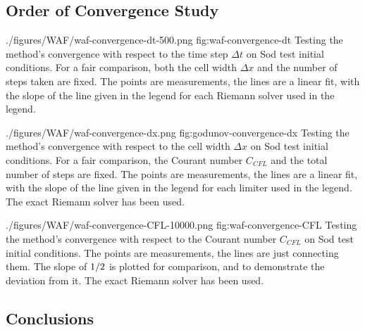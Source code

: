 \subsection{Order of Convergence Study}



\quickfigcap
	{./figures/WAF/waf-convergence-dt-500.png}
	{fig:waf-convergence-dt}
	{
		Testing the method's convergence with respect to the time step $\Delta t$ on Sod test initial conditions.
		For a fair comparison, both the cell width $\Delta x$ and the number of steps taken are fixed.
		The points are measurements, the lines are a linear fit, with the slope of the line given in the legend for each Riemann solver used in the legend.
	}


\quickfigcap
	{./figures/WAF/waf-convergence-dx.png}
	{fig:godunov-convergence-dx}
	{
		Testing the method's convergence with respect to the cell width $\Delta x$ on Sod test initial conditions.
		For a fair comparison, the Courant number $C_{CFL}$ and the total number of steps are fixed.
		The points are measurements, the lines are a linear fit, with the slope of the line given in the legend for each limiter used in the legend.
		The exact Riemann solver has been used.
	}
	
\quickfigcap
	{./figures/WAF/waf-convergence-CFL-10000.png}
	{fig:waf-convergence-CFL}
	{
		Testing the method's convergence with respect to the Courant number $C_{CFL}$ on Sod test initial conditions.
		The points are measurements, the lines are just connecting them.
		The slope of $1/2$ is plotted for comparison, and to demonstrate the deviation from it.
		The exact Riemann solver has been used.
	}























\subsection{Conclusions}


